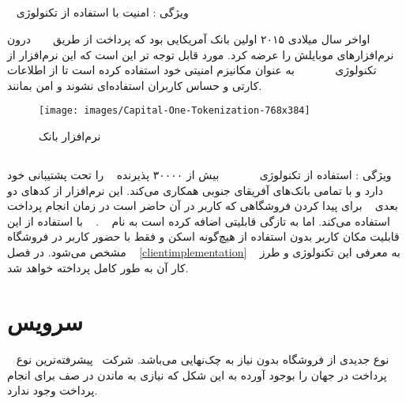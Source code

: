 \documentclass[oneside]{report}
\begin{document}
		\subsection{{\small {}}} 			 									 
		ویژگی : امنیت با استفاده از تکنولوژی 
					 			 				 {\normalsize {}}	
 
 
 اواخر سال میلادی ۲۰۱۵ اولین بانک آمریکایی بود که پرداخت از طریق 
 			 			 				 {\normalsize {}}	
 			 			 				 درون نرم‌افزار‌های موبایلش را عرضه کرد. مورد قابل توجه تر این است که این نرم‌افزار از تکنولوژی 
 			 			 				 			 			 				 {\normalsize {}}
 			 			 				 			 			 				 به عنوان مکانیزم امنیتی خود استفاده کرده است تا از اطلاعات کارتی و حساس کاربران استفاده‌ای نشوند و امن بمانند.
 			 			 				 			 			 				 
 \begin{figure}[h]
 	\centering
 	\texttt{[image: images/Capital-One-Tokenization-768x384]}
 	\caption{نرم‌افزار بانک {\footnotesize {}}}
 	\label{fig:capital-one-tokenization-768x384}
 \end{figure}

 			\subsection{{\small {}}}
 			ویژگی : استفاده از تکنولوژی 
 			 			 			 				 {\normalsize {}}	
 			 			 			 			\newline
  			 			 			 				 {\normalsize {}}
  			 			 			 				 بیش از ۳۰۰۰۰ پذیرنده 
  			 			 			 				  را تحت پشتیبانی خود دارد و با تمامی بانک‌های آفریقای جنوبی همکاری می‌کند. این نرم‌افزار از کد‌های دو بعدی 
برای پیدا کردن فروشگاهی که کاربر در آن حاضر است  در زمان انجام پرداخت استفاده می‌کند. اما به تازگی قابلیتی اضافه کرده است به نام 
 			 			 			 				 {\normalsize{}} . 
 			 			 			 				 با استفاده از این قابلیت مکان کاربر بدون استفاده از هیچ‌گونه اسکن و فقط با حضور کاربر در فروشگاه مشخص می‌شود. در فصل 
 			 			 			 				 \ref{clientimplementation}
 			 			 			 				 به معرفی این تکنولوژی و طرز کار آن به طور کامل پرداخته خواهد شد.
 	
	  \section{سرویس{\normalsize {}} }
 		{\normalsize {}} 		
 	نوع جدیدی از فروشگاه  بدون نیاز به چک‌نهایی
 	می‌باشد.
شرکت 
 		{\normalsize {}} پیشرفته‌ترین نوع پرداخت در جهان را بوجود آورده به این شکل که نیازی به ماندن در صف برای انجام پرداخت وجود ندارد. 
 	
\end{document}
